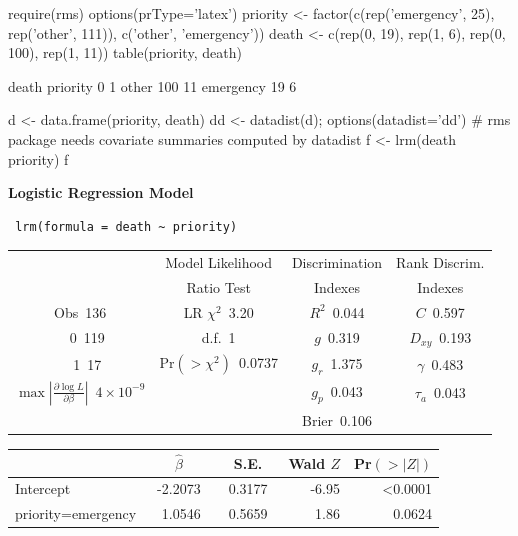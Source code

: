 \begin{Schunk}
\begin{Sinput}
require(rms)
options(prType='latex')
priority <- factor(c(rep('emergency', 25), rep('other', 111)), c('other', 'emergency'))
death <- c(rep(0, 19), rep(1, 6), rep(0, 100), rep(1, 11))
table(priority, death)
\end{Sinput}
\begin{Soutput}
           death
priority      0   1
  other     100  11
  emergency  19   6
\end{Soutput}
\end{Schunk}
\begin{Sinput}
d  <- data.frame(priority, death)
dd <- datadist(d); options(datadist='dd')
# rms package needs covariate summaries computed by datadist
f <- lrm(death ~ priority)
f
\end{Sinput}

 \centerline{\textbf{Logistic Regression Model}}
 
 \begin{verbatim}
 lrm(formula = death ~ priority)
 \end{verbatim}
 
 {\selectfont \begin{center}\begin{tabular}{|c|c|c|c|}\hline
&Model Likelihood&Discrimination&Rank Discrim.\\
&Ratio Test&Indexes&Indexes\\\hline
Obs~\hfill 136&LR $\chi^{2}$~\hfill 3.20&$R^{2}$~\hfill 0.044&$C$~\hfill 0.597\\
~~0~\hfill 119&d.f.~\hfill 1&$g$~\hfill 0.319&$D_{xy}$~\hfill 0.193\\
~~1~\hfill 17&Pr$(>\chi^{2})$~\hfill 0.0737&$g_{r}$~\hfill 1.375&$\gamma$~\hfill 0.483\\
$\max|\frac{\partial\log L}{\partial \beta}|$~\hfill $4\!\times\!10^{-9}$&&$g_{p}$~\hfill 0.043&$\tau_{a}$~\hfill 0.043\\
&&Brier~\hfill 0.106&\\
\hline
\end{tabular}
\end{center}}
 
 \setlongtables\begin{longtable}{lrrrr}\hline
 \multicolumn{1}{l}{}&\multicolumn{1}{c}{$\hat{\beta}$}&\multicolumn{1}{c}{S.E.}&\multicolumn{1}{c}{Wald $Z$}&\multicolumn{1}{c}{Pr$(>|Z|)$}\tabularnewline
 \hline
 \endhead
 \hline
 \endfoot
 Intercept&~-2.2073~&~0.3177~&-6.95&\textless 0.0001\tabularnewline
 priority=emergency&~ 1.0546~&~0.5659~& 1.86&0.0624\tabularnewline
 \hline
 \end{longtable}
 \addtocounter{table}{-1}

